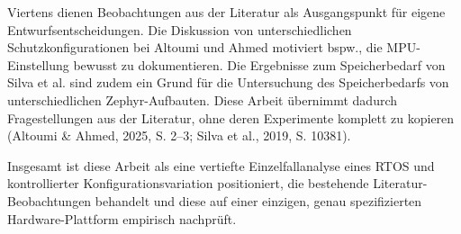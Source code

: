 Viertens dienen Beobachtungen aus der Literatur als Ausgangspunkt für eigene Entwurfsentscheidungen. Die Diskussion von unterschiedlichen Schutzkonfigurationen bei Altoumi und Ahmed motiviert bspw., die MPU-Einstellung bewusst zu dokumentieren. Die Ergebnisse zum Speicherbedarf von Silva et al. sind zudem ein Grund für die Untersuchung des Speicherbedarfs von unterschiedlichen Zephyr-Aufbauten. Diese Arbeit übernimmt dadurch Fragestellungen aus der Literatur, ohne deren Experimente komplett zu kopieren (Altoumi \& Ahmed, 2025, S. 2–3; Silva et al., 2019, S. 10381).

Insgesamt ist diese Arbeit als eine vertiefte Einzelfallanalyse eines RTOS und kontrollierter Konfigurationsvariation positioniert, die bestehende Literatur-Beobachtungen behandelt und diese auf einer einzigen, genau spezifizierten Hardware-Plattform empirisch nachprüft.
